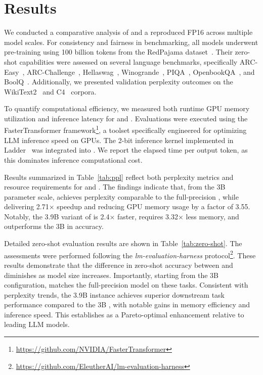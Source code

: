 \section{Results}

We conducted a comparative analysis of  and a reproduced FP16  across multiple model scales. For consistency and fairness in benchmarking, all models underwent pre-training using 100 billion tokens from the RedPajama dataset~\cite{redpajama}. Their zero-shot capabilities were assessed on several language benchmarks, specifically ARC-Easy~\cite{arc}, ARC-Challenge~\cite{arc}, Hellaswag~\cite{hellaswag}, Winogrande~\cite{winoGrande}, PIQA~\cite{piqa}, OpenbookQA~\cite{openbookqa}, and BoolQ~\cite{boolq}. Additionally, we presented validation perplexity outcomes on the WikiText2~\cite{wikitext2} and C4~\cite{c4} corpora.

To quantify computational efficiency, we measured both runtime GPU memory utilization and inference latency for  and . Evaluations were executed using the FasterTransformer framework\footnote{\url{https://github.com/NVIDIA/FasterTransformer}}, a toolset specifically engineered for optimizing LLM inference speed on GPUs. The 2-bit inference kernel implemented in Ladder~\cite{ladder} was integrated into . We report the elapsed time per output token, as this dominates inference computational cost.

Results summarized in Table~\ref{tab:ppl} reflect both perplexity metrics and resource requirements for  and . The findings indicate that, from the 3B parameter scale,  achieves perplexity comparable to the full-precision , while delivering 2.71$\times$ speedup and reducing GPU memory usage by a factor of 3.55. Notably, the 3.9B variant of  is 2.4$\times$ faster, requires 3.32$\times$ less memory, and outperforms the 3B  in accuracy.

Detailed zero-shot evaluation results are shown in Table~\ref{tab:zero-shot}. The assessments were performed following the \emph{lm-evaluation-harness} protocol\footnote{\url{https://github.com/EleutherAI/lm-evaluation-harness}}. These results demonstrate that the difference in zero-shot accuracy between  and  diminishes as model size increases. Importantly, starting from the 3B configuration,  matches the full-precision model on these tasks. Consistent with perplexity trends, the 3.9B  instance achieves superior downstream task performance compared to the 3B , with notable gains in memory efficiency and inference speed. This establishes  as a Pareto-optimal enhancement relative to leading LLM models.

